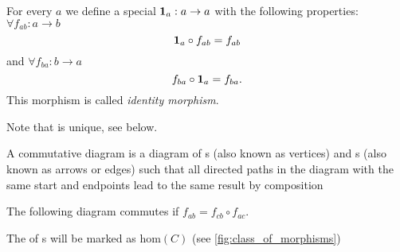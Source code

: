 \begin{definition}
  \label{def:id}
  For every  $a$ we define a special
   $\idarrow[a] : a \rightarrow a$ with the
  following properties: $\forall f_{ab} : a \rightarrow b$
  \begin{equation}
    \idarrow[a] \circ f_{ab} = f_{ab}
    \label{eq:leftid}
  \end{equation}
  and
  $\forall f_{ba} : b \rightarrow a$
  \begin{equation}
    f_{ba} \circ \idarrow[a]  = f_{ba}.
    \label{eq:rightid}
  \end{equation}
  This morphism is called \textit{identity morphism}.
\end{definition}

Note that  is unique, see
 below.

\begin{definition}
  A commutative diagram is a diagram of s (also known as
  vertices) and s (also known as arrows or
  edges) such that all directed paths in the diagram with the same
  start and endpoints lead to the same result by composition
  \label{def:commutative_diagram}

  The following diagram commutes if $f_{ab} = f_{cb} \circ f_{ac}$.

  \begin{center}
  \end{center}
\end{definition}


\begin{remark}
  \label{rem:morphclass}
  The  of s will be marked as 
  $\mathrm{hom}(C)$ (see \cref{fig:class_of_morphisms})
\end{remark}

